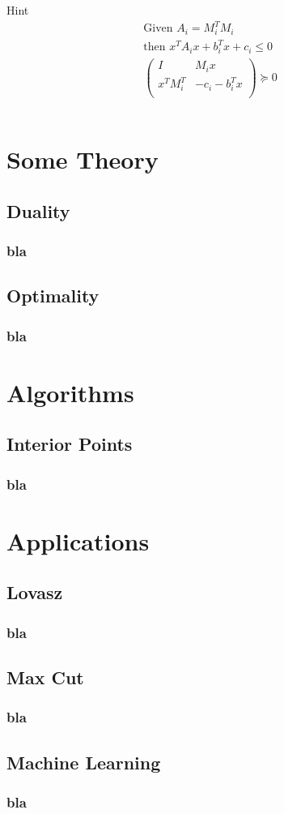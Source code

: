 \documentclass[11pt]{beamer}
\begin{document}
\begin{frame}
\begin{itemize}[leftmargin=-0.3cm]
\begin{columns}
\begin{column}{0.5\textwidth}
\begin{block}{Hint}
			\scriptsize
			\begin{equation*}
			\begin{aligned}
			\text{Given }A_i=M_i^TM_i\\
			\text{then }x^TA_ix+b_i^Tx+c_i\leq 0 \\
			\begin{pmatrix}
			I & M_ix\\
			x^TM_i^T & -c_i-b_i^Tx\\
			\end{pmatrix}
			\succeq 0
			\end{aligned}
			\end{equation*}
			\end{block}
		\end{column}
		\end{columns}
		\end{itemize}
	\end{frame}
\section{Some Theory}
\subsection{Duality}
	\begin{frame}
		\frametitle{bla}
	\end{frame}
\subsection{Optimality}
	\begin{frame}
		\frametitle{bla}
	\end{frame}
\section{Algorithms}
\subsection{Interior Points}
\begin{frame}
	\frametitle{bla}
\end{frame}
\section{Applications}
\subsection{Lovasz}
\begin{frame}
	\frametitle{bla}
\end{frame}
\subsection{Max Cut}
\begin{frame}
	\frametitle{bla}
\end{frame}
\subsection{Machine Learning}
\begin{frame}
	\frametitle{bla}
\end{frame}
\end{document}
